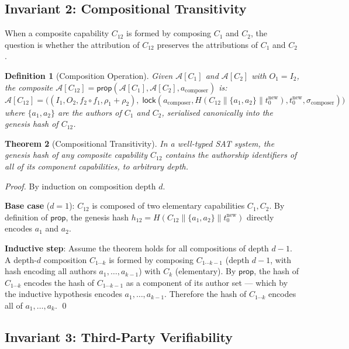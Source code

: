 \documentclass[12pt]{article}
\newtheorem{theorem}{Theorem}
\newtheorem{definition}[theorem]{Definition}
\newcommand{\ATTR}{\mathcal{A}}
\newcommand{\LOCK}{\mathsf{lock}}
\newcommand{\PROP}{\mathsf{prop}}
\begin{document}
\subsection{Invariant 2: Compositional Transitivity}

When a composite capability $C_{12}$ is formed by composing $C_1$ and $C_2$,
the question is whether the attribution of $C_{12}$ preserves the attributions
of $C_1$ and $C_2$.

\begin{definition}[Composition Operation]
  Given $\ATTR[C_1]$ and $\ATTR[C_2]$ with $O_1 = I_2$, the composite
  $\ATTR[C_{12}] = \PROP(\ATTR[C_1], \ATTR[C_2], a_\text{composer})$ is:
  \[
    \ATTR[C_{12}] = \bigl((I_1, O_2, f_2 \circ f_1, \rho_1 + \rho_2),\;
      \LOCK(a_\text{composer}, H(C_{12} \| \{a_1, a_2\} \| t_0^\text{new}),
            t_0^\text{new}, \sigma_\text{composer})\bigr)
  \]
  where $\{a_1, a_2\}$ are the authors of $C_1$ and $C_2$, serialised
  canonically into the genesis hash of $C_{12}$.
\end{definition}

\begin{theorem}[Compositional Transitivity]
  In a well-typed SAT system, the genesis hash of any composite capability
  $C_{12}$ contains the authorship identifiers of all of its component
  capabilities, to arbitrary depth.
\end{theorem}

\begin{proof}
  By induction on composition depth $d$.

  \medskip\noindent
  \textbf{Base case} ($d=1$): $C_{12}$ is composed of two elementary capabilities
  $C_1, C_2$.  By definition of $\PROP$, the genesis hash
  $h_{12} = H(C_{12} \| \{a_1, a_2\} \| t_0^{\text{new}})$ directly encodes
  $a_1$ and $a_2$.

  \medskip\noindent
  \textbf{Inductive step}: Assume the theorem holds for all compositions of depth
  $d-1$.  A depth-$d$ composition $C_{1\cdots k}$ is formed by composing
  $C_{1\cdots k-1}$ (depth $d-1$, with hash encoding all authors $a_1,\ldots,a_{k-1}$)
  with $C_k$ (elementary).  By $\PROP$, the hash of $C_{1\cdots k}$ encodes
  the hash of $C_{1\cdots k-1}$ as a component of its author set — which by the
  inductive hypothesis encodes $a_1, \ldots, a_{k-1}$.  Therefore the hash of
  $C_{1\cdots k}$ encodes all of $a_1, \ldots, a_k$. \qed
\end{proof}

\subsection{Invariant 3: Third-Party Verifiability}
\end{document}
